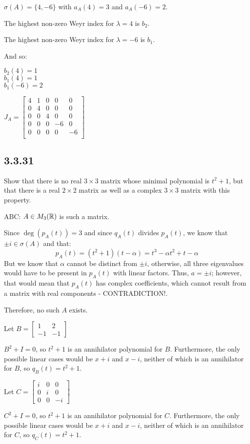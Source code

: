 \documentclass[letterpaper,12pt,fleqn]{article}
\renewcommand{\l}{\lambda}
\renewcommand{\o}{\sigma}
\renewcommand{\a}{\alpha}
\begin{document}
$\o(A)=\{4,-6\}$ with $a_A(4)=3$ and $a_A(-6)=2$.

The highest non-zero Weyr index for $\l=4$ is $b_2$.

The highest non-zero Weyr index for $\l=-6$ is $b_1$.

And so:

$b_2(4)=1$ \\
$b_1(4)=1$ \\
$b_1(-6)=2$

$J_A=\begin{bmatrix}
4 & 1 & 0 & 0 & 0 \\
0 & 4 & 0 & 0 & 0 \\
0 & 0 & 4 & 0 & 0 \\
0 & 0 & 0 & -6 & 0 \\
0 & 0 & 0 & 0 & -6 \\
\end{bmatrix}$

\subsection*{3.3.31}

Show that there is no real $3\times3$ matrix whose minimal polynomial is $t^2+1$, but
that there is a real $2\times2$ matrix as well as a complex $3\times3$ matrix with this
property.

ABC: $A\in M_3(\mathbb{R})$ is such a matrix.

Since $\deg(p_A(t))=3$ and since $q_A(t)$ divides $p_A(t)$, we know that $\pm i\in\o(A)$
and that:
\[p_A(t)=(t^2+1)(t-\a)=t^3-\a t^2+t-\a\]
But we know that $\a$ cannot be distinct from $\pm i$, otherwise, all three eigenvalues
would have to be present in $p_A(t)$ with linear factors. Thus, $a=\pm i$; however, that
would mean that $p_A(t)$ has complex coefficients, which cannot result from a matrix
with real components - CONTRADICTION!.

Therefore, no such $A$ exists.

Let $B=\begin{bmatrix} 1 & 2 \\ -1 & -1 \end{bmatrix}$

$B^2+I=0$, so $t^2+1$ is an annihilator polynomial for $B$. Furthermore, the only
possible linear cases would be $x+i$ and $x-i$, neither of which is an annihilator
for $B$, so $q_B(t)=t^2+1$.

Let $C=\begin{bmatrix} i & 0 & 0 \\ 0 & i & 0 \\ 0 & 0 & -i \end{bmatrix}$

$C^2+I=0$, so $t^2+1$ is an annihilator polynomial for $C$. Furthermore, the only
possible linear cases would be $x+i$ and $x-i$, neither of which is an annihilator
for $C$, so $q_C(t)=t^2+1$.
  
\end{document}
